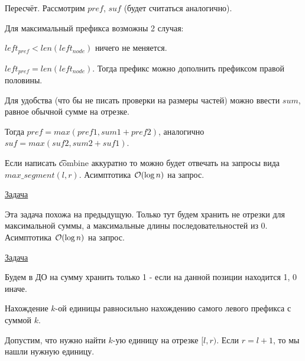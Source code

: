 \begin{center}
	\begin{figure}[h]
	\end{figure}
\end{center}

Пересчёт. Рассмотрим $pref$, $suf$ (будет считаться аналогично).

Для максимальный префикса возможны 2 случая:

\up \up
\begin{MyList}[0pt]
	\item $left_{pref} < len(left_{node})$ ничего не меняется.
	\item $left_{pref} = len(left_{node})$. Тогда префикс можно дополнить префиксом правой половины.
\end{MyList}
\up \up

Для удобства (что бы не писать проверки на размеры частей) можно ввести $sum$, равное обычной сумме на отрезке.

Тогда $pref=max(pref1,sum1+pref2)$, аналогично $suf=max(suf2,sum2+suf1)$.

Если написать \t{combine} аккуратно то можно будет отвечать на запросы вида $max\_segment(l, r)$. Асимптотика $\mathcal{O}(\log n)$ на запрос.

 \href{https://informatics.mccme.ru/mod/statements/view3.php?chapterid=111798}{Задача}

Эта задача похожа на предыдущую. Только тут будем хранить не отрезки для максимальной суммы, а максимальные длины последовательностей из 0. Асимптотика $\mathcal{O}(\log n)$ на запрос.


 \href{https://codeforces.com/edu/course/2/lesson/4/2/practice/contest/273278/problem/B}{Задача}

Будем в ДО на сумму хранить только 1 - если на данной позиции находится 1, 0 иначе.

Нахождение $k$-ой единицы равносильно нахождению самого левого префикса с суммой $k$.

Допустим, что нужно найти $k$-ую единицу на отрезке $[l,r)$.
Если $r=l+1$, то мы нашли нужную единицу. 

